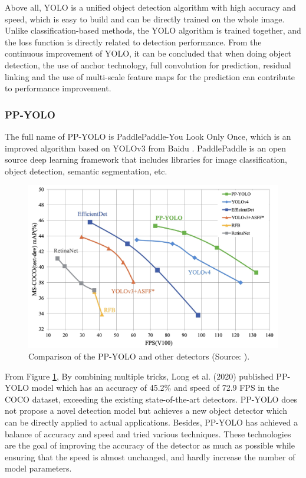 \documentclass[sensors,article,submit,moreauthors,pdftex]{Definitions/mdpi}
\begin{document}
Above all, YOLO is a unified object detection algorithm with high accuracy and speed, which is easy to build and can be directly trained on the whole image. Unlike classification-based methods, the YOLO algorithm is trained together, and the loss function is directly related to detection performance. From the continuous improvement of YOLO, it can be concluded that when doing object detection, the use of anchor technology, full convolution for prediction, residual linking and the use of multi-scale feature maps for the prediction can contribute to performance improvement.


\subsubsection{PP-YOLO}
The full name of PP-YOLO is PaddlePaddle-You Look Only Once, which is an improved algorithm based on YOLOv3 from Baidu \cite{long2020pp}. PaddlePaddle is an open source deep learning framework that includes libraries for image classification, object detection, semantic segmentation, etc.

\begin{figure}[htbp]
\centering
\includegraphics[width=1\columnwidth]{images/PP-YOLO.jpeg}
\caption{Comparison of the PP-YOLO and other detectors (Source: \cite{long2020pp}).}
\label{fig:pp-yolo}
\end{figure}

From Figure \ref{fig:pp-yolo}, By combining multiple tricks, Long et al. (2020) published PP-YOLO model which has an accuracy of 45.2\% and speed of 72.9 FPS in the COCO dataset, exceeding the existing state-of-the-art detectors. 
PP-YOLO does not propose a novel detection model but achieves a new object detector which can be directly applied to actual applications. Besides, PP-YOLO has achieved a balance of accuracy and speed and tried various techniques. These technologies are the goal of improving the accuracy of the detector as much as possible while ensuring that the speed is almost unchanged, and hardly increase the number of model parameters.
\end{document}
